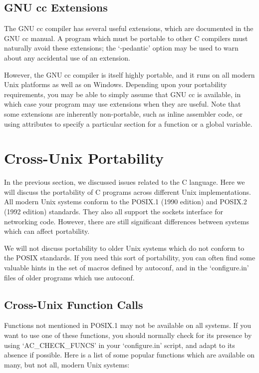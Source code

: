 \subsection{GNU cc Extensions}

The GNU cc compiler has several useful extensions, which are documented in the GNU cc manual. A program which must be portable to other C compilers must naturally avoid these extensions; the `-pedantic' option may be used to warn about any accidental use of an extension.

However, the GNU cc compiler is itself highly portable, and it runs on all modern Unix platforms as well as on Windows. Depending upon your portability requirements, you may be able to simply assume that GNU cc is available, in which case your program may use extensions when they are useful. Note that some extensions are inherently non-portable, such as inline assembler code, or using attributes to specify a particular section for a function or a global variable. 

\section{Cross-Unix Portability}

In the previous section, we discussed issues related to the C language. Here we will discuss the portability of C programs across different Unix implementations. All modern Unix systems conform to the POSIX.1 (1990 edition) and POSIX.2 (1992 edition) standards. They also all support the sockets interface for networking code. However, there are still significant differences between systems which can affect portability.

We will not discuss portability to older Unix systems which do not conform to the POSIX standards. If you need this sort of portability, you can often find some valuable hints in the set of macros defined by autoconf, and in the `configure.in' files of older programs which use autoconf. 

\subsection{Cross-Unix Function Calls}

Functions not mentioned in POSIX.1 may not be available on all systems. If you want to use one of these functions, you should normally check for its presence by using `AC\_{}CHECK\_{}FUNCS' in your `configure.in' script, and adapt to its absence if possible. Here is a list of some popular functions which are available on many, but not all, modern Unix systems:

